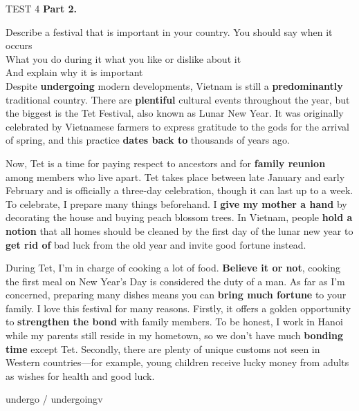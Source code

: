 \begin{glossarymc}[Cambridge 5]
\begin{test}{TEST 4}
    \noindent
    \textbf{Part 2.}
    \begin{qa}{Describe a festival that is important in your country.}
    You should say when it occurs\\
    What you do during it what you like or dislike about it\\
    And explain why it is important\\

    Despite \textbf{undergoing} modern developments, Vietnam is still a \textbf{predominantly} traditional country. There are \textbf{plentiful} cultural events throughout the year, but the biggest is the Tet Festival, also known as Lunar New Year. It was originally celebrated by Vietnamese farmers to express gratitude to the gods for the arrival of spring, and this practice \textbf{dates back to} thousands of years ago.

    Now, Tet is a time for paying respect to ancestors and for \textbf{family reunion} among members who live apart. Tet takes place between late January and early February and is officially a three-day celebration, though it can last up to a week. To celebrate, I prepare many things beforehand. I \textbf{give my mother a hand} by decorating the house and buying peach blossom trees. In Vietnam, people \textbf{hold a notion} that all homes should be cleaned by the first day of the lunar new year to \textbf{get rid of} bad luck from the old year and invite good fortune instead.

    During Tet, I’m in charge of cooking a lot of food. \textbf{Believe it or not}, cooking the first meal on New Year’s Day is considered the duty of a man. As far as I’m concerned, preparing many dishes means you can \textbf{bring much fortune} to your family. I love this festival for many reasons. Firstly, it offers a golden opportunity to \textbf{strengthen the bond} with family members. To be honest, I work in Hanoi while my parents still reside in my hometown, so we don’t have much \textbf{bonding time} except Tet. Secondly, there are plenty of unique customs not seen in Western countries—for example, young children receive lucky money from adults as wishes for health and good luck.
    \end{qa}

        \begin{VocabExplain}[Part 2]
            \begin{ExplainCard}{undergo / undergoing}{v}
            \end{ExplainCard}


\end{VocabExplain}
\end{test}
\end{glossarymc}
